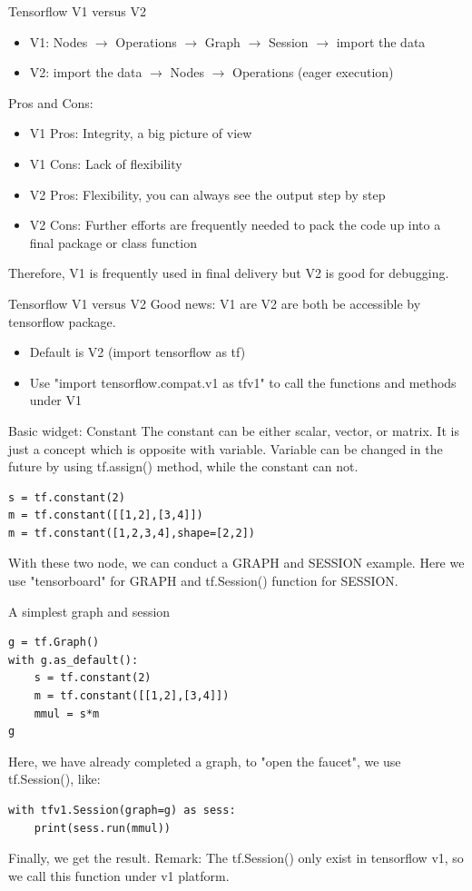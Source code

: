\documentclass{beamer}
\begin{document}
\begin{frame}[fragile]{Tensorflow V1 versus V2}
\begin{itemize}
	\item V1: Nodes $ \to $  Operations $ \to$ Graph $\to$ Session $\to$ import the data
	\item V2: import the data $\to$ Nodes  $\to$ Operations (eager execution)
\end{itemize}
Pros and Cons:
\begin{itemize}
	\item V1 Pros: Integrity, a big picture of view
	\item V1 Cons: Lack of flexibility
	\item V2 Pros: Flexibility, you can always see the output step by step
	\item V2 Cons: Further efforts are frequently needed to pack the code up into a final package or class function
\end{itemize}
Therefore, V1 is frequently used in final delivery but V2 is good for debugging.
\end{frame}


\begin{frame}[fragile]{Tensorflow V1 versus V2}
Good news: V1 are V2 are both be accessible by tensorflow package.
\begin{itemize}
	\item Default is V2 (import tensorflow as tf)
	\item Use "import tensorflow.compat.v1 as tfv1" to call the functions and methods under V1
\end{itemize}
\end{frame}


\begin{frame}[fragile]{Basic widget: Constant}
The constant can be either scalar, vector, or matrix. It is just a concept which is opposite with variable. Variable can be changed in the future by using tf.assign() method, while the constant can not.
\begin{lstlisting}[style = Python]
s = tf.constant(2)
m = tf.constant([[1,2],[3,4]])
m = tf.constant([1,2,3,4],shape=[2,2])
\end{lstlisting}
With these two node, we can conduct a GRAPH and SESSION example. Here we use "tensorboard" for GRAPH and tf.Session() function for SESSION.
\end{frame}

\begin{frame}[fragile]{A simplest graph and session}
\begin{lstlisting}[style = Python]
g = tf.Graph()
with g.as_default():
    s = tf.constant(2)
    m = tf.constant([[1,2],[3,4]])
    mmul = s*m
g
\end{lstlisting}
Here, we have already completed a graph, to "open the faucet", we use tf.Session(), like:
\begin{lstlisting}[style = Python]
with tfv1.Session(graph=g) as sess:
    print(sess.run(mmul))
\end{lstlisting}
Finally, we get the result. Remark: The tf.Session() only exist in tensorflow v1, so we call this function under v1 platform.
\end{frame}
\end{document}
